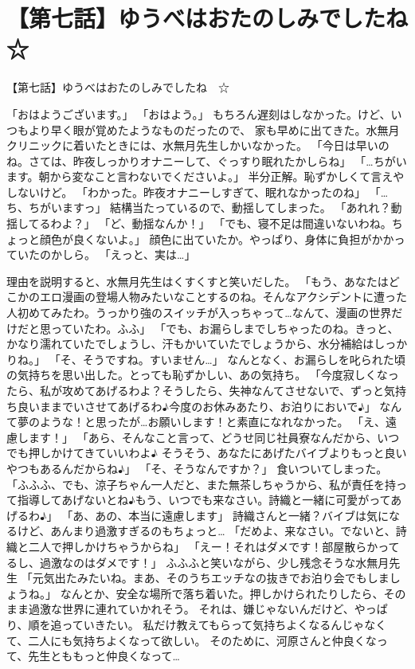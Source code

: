 \section{【第七話】ゆうべはおたのしみでしたね　☆}
【第七話】ゆうべはおたのしみでしたね　☆


「おはようございます。」
「おはよう。」
もちろん遅刻はしなかった。けど、いつもより早く眼が覚めたようなものだったので、
家も早めに出てきた。水無月クリニックに着いたときには、水無月先生しかいなかった。
「今日は早いのね。さては、昨夜しっかりオナニーして、ぐっすり眠れたかしらね」
「…ちがいます。朝から変なこと言わないでくださいよ。」
半分正解。恥ずかしくて言えやしないけど。
「わかった。昨夜オナニーしすぎて、眠れなかったのね」
「…ち、ちがいますっ」
結構当たっているので、動揺してしまった。
「あれれ？動揺してるわよ？」
「ど、動揺なんか！」
「でも、寝不足は間違いないわね。ちょっと顔色が良くないよ。」
顔色に出ていたか。やっぱり、身体に負担がかかっていたのかしら。
「えっと、実は…」

理由を説明すると、水無月先生はくすくすと笑いだした。
「もう、あなたはどこかのエロ漫画の登場人物みたいなことするのね。そんなアクシデントに遭った人初めてみたわ。うっかり強のスイッチが入っちゃって…なんて、漫画の世界だけだと思っていたわ。ふふ」
「でも、お漏らしまでしちゃったのね。きっと、かなり濡れていたでしょうし、汗もかいていたでしょうから、水分補給はしっかりね。」
「そ、そうですね。すいません…」
なんとなく、お漏らしを叱られた頃の気持ちを思い出した。とっても恥ずかしい、あの気持ち。
「今度寂しくなったら、私が攻めてあげるわよ？そうしたら、失神なんてさせないで、ずっと気持ち良いままでいさせてあげるわ♪今度のお休みあたり、お泊りにおいで♪」
なんて夢のような！と思ったが…お願いします！と素直になれなかった。
「え、遠慮します！」
「あら、そんなこと言って、どうせ同じ社員寮なんだから、いつでも押しかけてきていいわよ♪
そうそう、あなたにあげたバイブよりもっと良いやつもあるんだからね♪」
「そ、そうなんですか？」
食いついてしまった。
「ふふふ、でも、涼子ちゃん一人だと、また無茶しちゃうから、私が責任を持って指導してあげないとね♪もう、いつでも来なさい。詩織と一緒に可愛がってあげるわ♪」
「あ、あの、本当に遠慮します」
詩織さんと一緒？バイブは気になるけど、あんまり過激すぎるのもちょっと…
「だめよ、来なさい。でないと、詩織と二人で押しかけちゃうからね」
「えー！それはダメです！部屋散らかってるし、過激なのはダメです！」
ふふふと笑いながら、少し残念そうな水無月先生
「元気出たみたいね。まあ、そのうちエッチなの抜きでお泊り会でもしましょうね。」
なんとか、安全な場所で落ち着いた。押しかけられたりしたら、そのまま過激な世界に連れていかれそう。
それは、嫌じゃないんだけど、やっぱり、順を追っていきたい。
私だけ教えてもらって気持ちよくなるんじゃなくて、二人にも気持ちよくなって欲しい。
そのために、河原さんと仲良くなって、先生とももっと仲良くなって…

